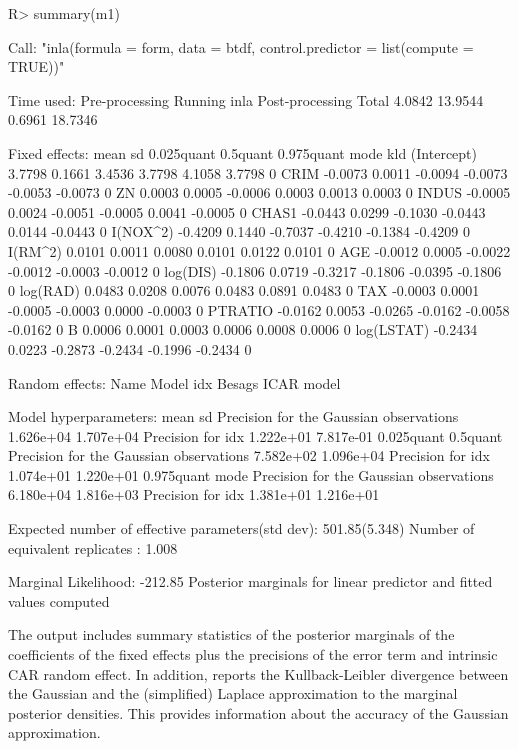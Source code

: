 \documentclass[article]{jss}
\begin{document}
\begin{Schunk}
\begin{Sinput}
R> summary(m1)
\end{Sinput}
\begin{Soutput}
Call:
"inla(formula = form, data = btdf, control.predictor = list(compute = TRUE))"

Time used:
 Pre-processing    Running inla Post-processing           Total 
         4.0842         13.9544          0.6961         18.7346 

Fixed effects:
               mean     sd 0.025quant 0.5quant 0.975quant    mode kld
(Intercept)  3.7798 0.1661     3.4536   3.7798     4.1058  3.7798   0
CRIM        -0.0073 0.0011    -0.0094  -0.0073    -0.0053 -0.0073   0
ZN           0.0003 0.0005    -0.0006   0.0003     0.0013  0.0003   0
INDUS       -0.0005 0.0024    -0.0051  -0.0005     0.0041 -0.0005   0
CHAS1       -0.0443 0.0299    -0.1030  -0.0443     0.0144 -0.0443   0
I(NOX^2)    -0.4209 0.1440    -0.7037  -0.4210    -0.1384 -0.4209   0
I(RM^2)      0.0101 0.0011     0.0080   0.0101     0.0122  0.0101   0
AGE         -0.0012 0.0005    -0.0022  -0.0012    -0.0003 -0.0012   0
log(DIS)    -0.1806 0.0719    -0.3217  -0.1806    -0.0395 -0.1806   0
log(RAD)     0.0483 0.0208     0.0076   0.0483     0.0891  0.0483   0
TAX         -0.0003 0.0001    -0.0005  -0.0003     0.0000 -0.0003   0
PTRATIO     -0.0162 0.0053    -0.0265  -0.0162    -0.0058 -0.0162   0
B            0.0006 0.0001     0.0003   0.0006     0.0008  0.0006   0
log(LSTAT)  -0.2434 0.0223    -0.2873  -0.2434    -0.1996 -0.2434   0

Random effects:
Name	  Model
 idx   Besags ICAR model 

Model hyperparameters:
                                        mean      sd       
Precision for the Gaussian observations 1.626e+04 1.707e+04
Precision for idx                       1.222e+01 7.817e-01
                                        0.025quant 0.5quant 
Precision for the Gaussian observations 7.582e+02  1.096e+04
Precision for idx                       1.074e+01  1.220e+01
                                        0.975quant mode     
Precision for the Gaussian observations 6.180e+04  1.816e+03
Precision for idx                       1.381e+01  1.216e+01

Expected number of effective parameters(std dev): 501.85(5.348)
Number of equivalent replicates : 1.008 

Marginal Likelihood:  -212.85 
Posterior marginals for linear predictor and fitted values computed
\end{Soutput}
\end{Schunk}
\noindent
The output includes summary statistics of the posterior marginals of the
coefficients of the fixed effects plus the precisions of the error term and
intrinsic CAR random effect. In addition,  reports the
Kullback-Leibler divergence between the Gaussian and the (simplified)
Laplace approximation to the marginal posterior densities. This provides
information about the accuracy of the Gaussian approximation. 
\end{document}
